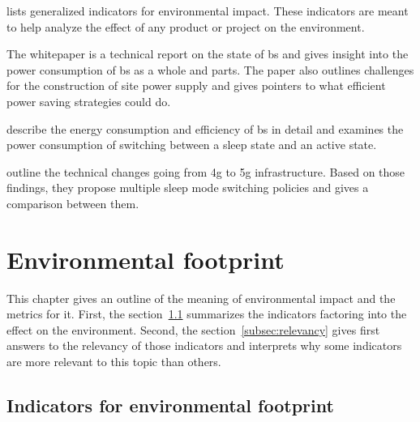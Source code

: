 \documentclass[11pt,a4paper]{article}
\begin{document}
\citep{Umweltindikatoren} lists generalized indicators for environmental impact.
These indicators are meant to help analyze the effect of any product or project on the environment.

The whitepaper \citep{powerwhitepaper} is a technical report on the state of \acrfull{bs} and gives insight into the power consumption of \acrshort{bs} as a whole and parts.
The paper also outlines challenges for the construction of site power supply and gives pointers to what efficient power saving strategies could do.

\citep{5GEfficiencyOverview} describe the energy consumption and efficiency of \acrshort{bs} in detail and examines the power consumption of switching between a sleep state and an active state.

\citep{DynamicSleepModeControl} outline the technical changes going from \acrshort{4g} to \acrfull{5g} infrastructure.
Based on those findings, they propose multiple sleep mode switching policies and gives a comparison between them.

\section{Environmental footprint}\label{sec:energyfootprint}
This chapter gives an outline of the meaning of environmental impact and the metrics for it.
First, the section~\ref{subsec:indicators} summarizes the indicators factoring into the effect on the environment.
Second, the section~\ref{subsec:relevancy} gives first answers to the relevancy of those indicators and interprets why some indicators are more relevant to this topic than others.

\subsection{Indicators for environmental footprint}\label{subsec:indicators}
\end{document}
